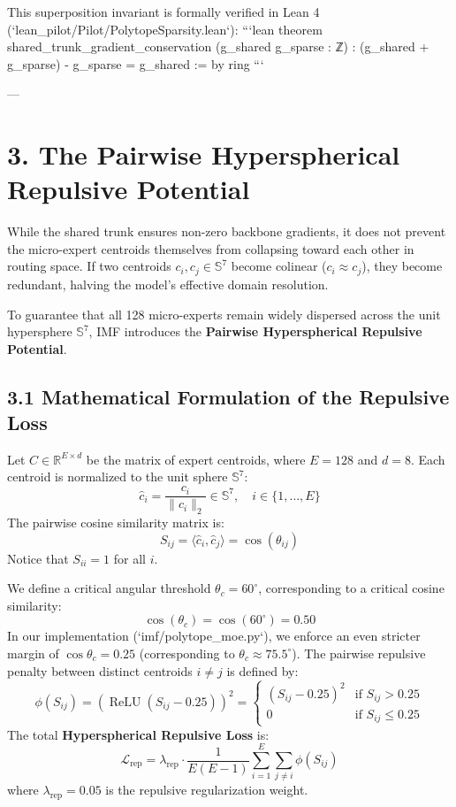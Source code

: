 \documentclass[11pt,twoside,openright]{amsbook}
\begin{document}
{{{{{{{{This superposition invariant is formally verified in Lean 4 (`lean_pilot/Pilot/PolytopeSparsity.lean`):
```lean
theorem shared_trunk_gradient_conservation (g_shared g_sparse : ℤ) :
    (g_shared + g_sparse) - g_sparse = g_shared := by
  ring
```

---

\section{3. The Pairwise Hyperspherical Repulsive Potential}

While the shared trunk ensures non-zero backbone gradients, it does not prevent the micro-expert centroids themselves from collapsing toward each other in routing space. If two centroids $c_i, c_j \in \mathbb{S}^7$ become colinear ($c_i \approx c_j$), they become redundant, halving the model's effective domain resolution.

To guarantee that all 128 micro-experts remain widely dispersed across the unit hypersphere $\mathbb{S}^7$, IMF introduces the \textbf{Pairwise Hyperspherical Repulsive Potential}.

\subsection{3.1 Mathematical Formulation of the Repulsive Loss}

Let $C \in \mathbb{R}^{E \times d}$ be the matrix of expert centroids, where $E = 128$ and $d = 8$. Each centroid is normalized to the unit sphere $\mathbb{S}^7$:
$$\hat{c}_i = \frac{c_i}{\|c_i\|_2} \in \mathbb{S}^7, \quad i \in \{1, \dots, E\}$$
The pairwise cosine similarity matrix is:
$$S_{ij} = \langle \hat{c}_i, \hat{c}_j \rangle = \cos(\theta_{ij})$$
Notice that $S_{ii} = 1$ for all $i$.

We define a critical angular threshold $\theta_c = 60^\circ$, corresponding to a critical cosine similarity:
$$\cos(\theta_c) = \cos(60^\circ) = 0.50$$
In our implementation (`imf/polytope_moe.py`), we enforce an even stricter margin of $\cos\theta_c = 0.25$ (corresponding to $\theta_c \approx 75.5^\circ$).
The pairwise repulsive penalty between distinct centroids $i \ne j$ is defined by:
$$\phi(S_{ij}) = \left( \operatorname{ReLU}(S_{ij} - 0.25) \right)^2 = \begin{cases} (S_{ij} - 0.25)^2 & \text{if } S_{ij} > 0.25 \\ 0 & \text{if } S_{ij} \le 0.25 \end{cases}$$
The total \textbf{Hyperspherical Repulsive Loss} is:
$$\mathcal{L}_{\text{rep}} = \lambda_{\text{rep}} \cdot \frac{1}{E(E - 1)} \sum_{i=1}^E \sum_{j \ne i} \phi(S_{ij})$$
where $\lambda_{\text{rep}} = 0.05$ is the repulsive regularization weight.

}}}}}}}}
\end{document}
